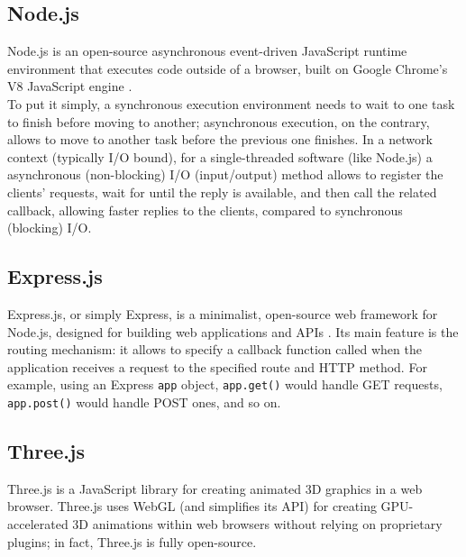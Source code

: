 \subsection{Node.js}
Node.js is an open-source asynchronous event-driven JavaScript runtime environment that executes code outside of a browser, built on Google Chrome's V8 JavaScript engine \cite{Node.js}.\\
To put it simply, a synchronous execution environment needs to wait to one task to finish before moving to another; asynchronous execution, on the contrary, allows to move to another task before the previous one finishes. In a network context (typically I/O bound), for a single-threaded software (like Node.js) a asynchronous (non-blocking) I/O (input/output) method allows to register the clients' requests, wait for until the reply is available, and then call the related callback, allowing faster replies to the clients, compared to synchronous (blocking) I/O.

\subsection{Express.js}
Express.js, or simply Express, is a minimalist, open-source web framework for Node.js, designed for building web applications and APIs \cite{Express.js}. Its main feature is the routing mechanism: it allows to specify a callback function called when the application receives a request to the specified route and HTTP method. For example, using an Express \texttt{app} object, \texttt{app.get()} would handle GET requests, \texttt{app.post()} would handle POST ones, and so on.

\subsection{Three.js}
Three.js is a JavaScript library for creating animated 3D graphics in a web browser. Three.js uses WebGL (and simplifies its API) for creating GPU-accelerated 3D animations within web browsers without relying on proprietary plugins; in fact, Three.js is fully open-source.

